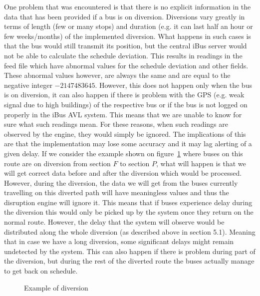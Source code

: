 One problem that was encountered is that there is no explicit information in the data that has been provided if a bus is on diversion. Diversions vary greatly in terms of length (few or many stops) and duration (e.g. it can last half an hour or few weeks/months) of the implemented diversion. What happens in such cases is that the bus would still transmit its position, but the central iBus server would not be able to calculate the schedule deviation. This results in readings in the feed file which have abnormal values for the schedule deviation and other fields. These abnormal values however, are always the same and are equal to the negative integer $-2147483645$. However, this does not happen only when the bus is on diversion, it can also happen if there is problem with the GPS (e.g. weak signal due to high buildings) of the respective bus or if the bus is not logged on properly in the iBus AVL system. This means that we are unable to know for sure what such readings mean. For these reasons, when such readings are observed by the engine, they would simply be ignored. The implications of this are that the implementation may lose some accuracy and it may lag alerting of a given delay. If we consider the example shown on figure~\ref{fig:diversion} where buses on this route are on diversion from section $F$ to section $P$, what will happen is that we will get correct data before and after the diversion which would be processed. However, during the diversion, the data we will get from the buses currently travelling on this diverted path will have meaningless values and thus the disruption engine will ignore it. This means that if buses experience delay during the diversion this would only be picked up by the system once they return on the normal route. However, the delay that the system will observe would be distributed along the whole diversion (as described above in section 5.1). Meaning that in case we have a long diversion, some significant delays might remain undetected by the system. This can also happen if there is problem during part of the diversion, but during the rest of the diverted route the buses actually manage to get back on schedule.
\begin{figure}[ht]
	\caption{Example of diversion}
	\label{fig:diversion}
\end{figure}

